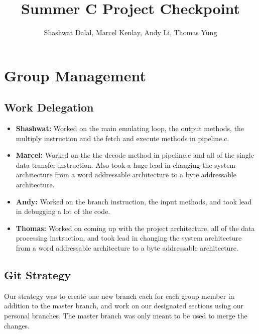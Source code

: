 \documentclass[11pt]{article}
\begin{document}
\title{Summer C Project Checkpoint}
\author{Shashwat Dalal, Marcel Kenlay, Andy Li, Thomas Yung}




\maketitle

\section{Group Management}
\subsection{Work Delegation}

\begin{itemize}
\item \textbf{Shashwat:} Worked on the main emulating loop, the output methods, the multiply instruction and the fetch and execute methods in pipeline.c.
\item \textbf{Marcel:} Worked on the the decode method in pipeline.c and all of the single data transfer instruction. Also took a huge lead in changing the system architecture from a word addressable architecture to a byte addressable architecture.
\item \textbf{Andy:} Worked on the branch instruction, the input methods, and took lead in debugging a lot of the code.
\item \textbf{Thomas:} Worked on coming up with the project architecture, all of the data processing instruction, and took lead in changing the system architecture from a word addressable architecture to a byte addressable architecture.
\end{itemize}

\subsection{Git Strategy}
Our strategy was to create one new branch each for each group member in addition to the master branch, and work on our designated sections using our personal branches. The master branch was only meant to be used to merge the changes.
\end{document}
